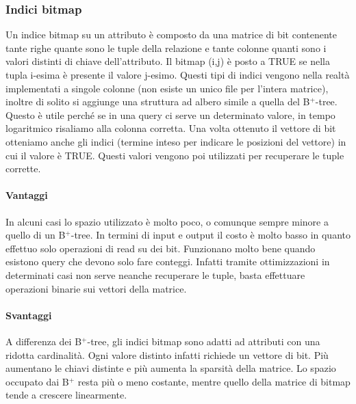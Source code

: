 \subsubsection{Indici bitmap}
Un indice bitmap su un attributo è composto da una matrice di bit contenente tante righe quante sono le tuple della relazione e tante colonne quanti sono i valori distinti di chiave dell'attributo. Il bitmap (i,j) è posto a TRUE se nella tupla i-esima è presente il valore j-esimo. Questi tipi di indici vengono nella realtà implementati a singole colonne (non esiste un unico file per l'intera matrice), inoltre di solito si aggiunge una struttura ad albero simile a quella del B$^{+}$-tree. Questo è utile perché se in una query ci serve un determinato valore, in tempo logaritmico risaliamo alla colonna corretta. Una volta ottenuto il vettore di bit otteniamo anche gli indici (termine inteso per indicare le posizioni del vettore) in cui il valore è TRUE. Questi valori vengono poi utilizzati per recuperare le tuple corrette.

\paragraph{Vantaggi}
In alcuni casi lo spazio utilizzato è molto poco, o comunque sempre minore a quello di un B$^{+}$-tree. In termini di input e output il costo è molto basso in quanto effettuo solo operazioni di read su dei bit. Funzionano molto bene quando esistono query che devono solo fare conteggi. Infatti tramite ottimizzazioni in determinati casi non serve neanche recuperare le tuple, basta  effettuare operazioni binarie sui vettori della matrice.
\begin{info}
\end{info}

\paragraph{Svantaggi}
A differenza dei B$^{+}$-tree, gli indici bitmap sono adatti ad attributi con una ridotta cardinalità. Ogni valore distinto infatti richiede un vettore di bit. Più aumentano le chiavi distinte e più aumenta la sparsità della matrice. Lo spazio occupato dai B$^{+}$ resta più o meno costante, mentre quello della matrice di bitmap tende a crescere linearmente.


